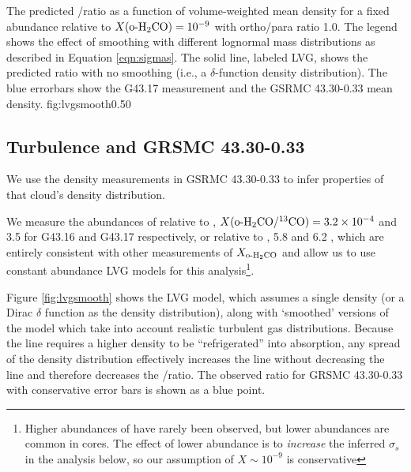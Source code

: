{The predicted \formaldehyde \oneone/\twotwo ratio as a function of volume-weighted mean
density for a fixed abundance relative to \hh $X(\textrm{o-H}_2\textrm{CO}) = 10^{-9}$  with \hh
ortho/para ratio 1.0.  The legend shows the effect of smoothing with different
lognormal mass distributions as described in Equation \ref{eqn:sigmas}.  %
The solid line, labeled LVG, shows the predicted ratio
with no smoothing (i.e., a $\delta$-function density distribution).
The blue errorbars show the G43.17 \formaldehyde measurement and the GSRMC
43.30-0.33 mean density.
}
{fig:lvgsmooth}{0.5}{0}

\subsection{Turbulence and GRSMC 43.30-0.33}
\label{sec:grsmcturb}
We use the density measurements in GSRMC 43.30-0.33 to infer properties of that
cloud's density distribution.

We measure the abundances of \ortho relative to \thirteenco,
$X(\textrm{o-H}_2\textrm{CO}/^{13}\textrm{CO}) = 3.2\times10^{-4}$ and 3.5 for G43.16 and G43.17
respectively, or relative to \hh, 5.8 and 6.2 , which are
entirely consistent with other measurements of $X_{\textrm{o-H}_2\textrm{CO}}$
\citep{Johnstone2003a} and allow us to use constant abundance LVG models for this
analysis\footnote{Higher abundances of \formaldehyde have rarely been observed,
but lower abundances are common in cores.  The effect of lower abundance is to
\emph{increase} the inferred $\sigma_s$ in the analysis below, so our
assumption of $X\sim10^{-9}$ is conservative}.  

Figure \ref{fig:lvgsmooth} shows the LVG model, which assumes a single density
(or a Dirac $\delta$ function as the density distribution), along with
`smoothed' versions of the model which take into account realistic turbulent
gas distributions.  Because the \formaldehyde \twotwo line requires a higher
density to be ``refrigerated'' into absorption, any spread of the density
distribution effectively increases the \twotwo line without decreasing the
\oneone line and therefore decreases the \oneone/\twotwo ratio.  The observed
ratio for GRSMC 43.30-0.33 with conservative error bars is shown as a blue
point.  

